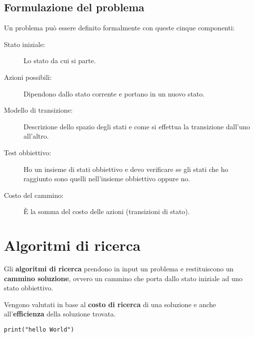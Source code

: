 \subsection{Formulazione del problema}
Un problema pu\`o essere definito formalmente con queste cinque componenti:
\begin{description}
	\item[Stato iniziale:] Lo stato da cui si parte.
	\item[Azioni possibili:] Dipendono dallo stato corrente e portano in un nuovo stato.
	\item[Modello di transizione:] Descrizione dello spazio degli stati e come si effettua
	      la transizione dall'uno all'altro.
	\item[Test obbiettivo:] Ho un insieme di stati obbiettivo e devo verificare se gli stati
	      che ho raggiunto sono quelli nell'insieme obbiettivo oppure no.
	\item[Costo del cammino:] \`E la somma del costo delle azioni (transizioni di stato).
\end{description}

\section{Algoritmi di ricerca}
Gli \textbf{algoritmi di ricerca} prendono in input un problema e restituiscono un
\textbf{cammino soluzione}, ovvero un cammino che porta dallo stato iniziale ad uno stato
obbiettivo.

Vengono valutati in base al \textbf{costo di ricerca} di una soluzione e anche
all'\textbf{efficienza} della soluzione trovata.

\begin{lstlisting}[style=py]
	print("hello World")
\end{lstlisting}
